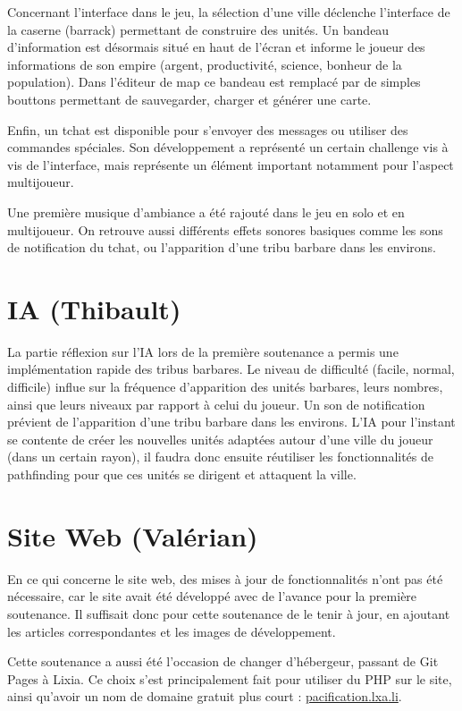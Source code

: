 \documentclass[12pt]{report}
\begin{document}
Concernant l'interface dans le jeu, la sélection d'une ville déclenche
l'interface de la caserne (barrack) permettant de construire des unités. Un
bandeau d'information est désormais situé en haut de l'écran et informe le
joueur des informations de son empire (argent, productivité, science, bonheur
de la population). Dans l'éditeur de map ce bandeau est remplacé par de simples
bouttons permettant de sauvegarder, charger et générer une carte.

Enfin, un tchat est disponible pour s'envoyer des messages ou utiliser des
commandes spéciales. Son développement a représenté un certain challenge vis à
vis de l'interface, mais représente un élément important notamment pour
l'aspect multijoueur.

Une première musique d'ambiance a été rajouté dans le jeu en solo et en
multijoueur. On retrouve aussi différents effets sonores basiques comme les
sons de notification du tchat, ou l'apparition d'une tribu barbare dans les
environs.

\section{IA (Thibault)}

La partie réflexion sur l'IA lors de la première soutenance a permis une
implémentation rapide des tribus barbares. Le niveau de difficulté (facile,
normal, difficile) influe sur la fréquence d'apparition des unités barbares,
leurs nombres, ainsi que leurs niveaux par rapport à celui du joueur. Un son de
notification prévient de l'apparition d'une tribu barbare dans les environs.
L'IA pour l'instant se contente de créer les nouvelles unités adaptées autour
d'une ville du joueur (dans un certain rayon), il faudra donc ensuite réutiliser
les fonctionnalités de pathfinding pour que ces unités se dirigent et attaquent
la ville.

\section{Site Web (Valérian)}

En ce qui concerne le site web, des mises à jour de fonctionnalités n’ont pas
été nécessaire, car le site avait été développé avec de l’avance pour la
première soutenance. Il suffisait donc pour cette soutenance de le tenir à
jour, en ajoutant les articles correspondantes et les images de développement.

Cette soutenance a aussi été l’occasion de changer d'hébergeur, passant de Git
Pages à Lixia. Ce choix s’est principalement fait pour utiliser du PHP sur le
site, ainsi qu'avoir un nom de domaine gratuit plus court :
\url{pacification.lxa.li}.
\end{document}
